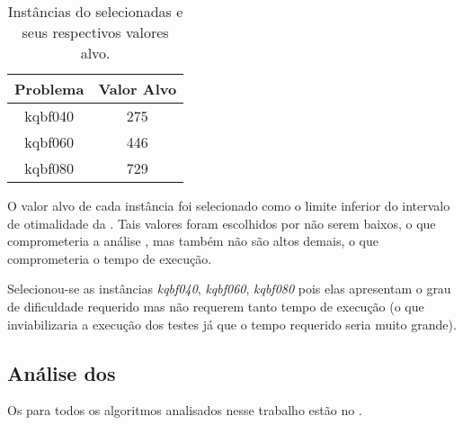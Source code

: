 \begin{table}[H]
    \centering
    \begin{tabular}{|c|c|}
        \hline
        \textbf{Problema} & \textbf{Valor Alvo} \\\hline
        kqbf040           & 275                 \\\hline
        kqbf060           & 446                 \\\hline
        kqbf080           & 729                 \\\hline
    \end{tabular}
    \caption{Instâncias do \maxkqbf selecionadas e seus respectivos valores alvo.}
    \label{tab:problem-target-value}
\end{table}

O valor alvo de cada instância foi selecionado como o limite inferior do intervalo de otimalidade da . Tais valores foram escolhidos por não serem baixos, o que comprometeria a análise \cite{bib:ttt}, mas também não são altos demais, o que comprometeria o tempo de execução.

Selecionou-se as instâncias \textit{kqbf040}, \textit{kqbf060}, \textit{kqbf080} pois elas apresentam o grau de dificuldade requerido mas não requerem tanto tempo de execução (o que inviabilizaria a execução dos testes já que o tempo requerido seria muito grande).

\subsection{Análise dos \ttt}

Os \ttt para todos os algoritmos analisados nesse trabalho estão no .

